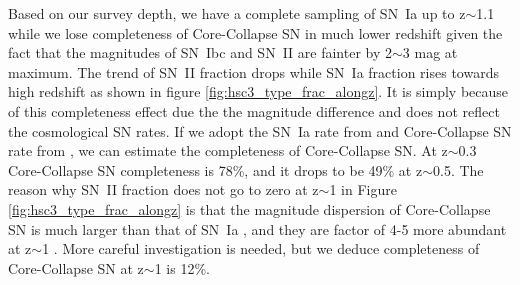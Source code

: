\documentclass[useamsfonts]{pasj01}
\begin{document}
Based on our survey depth, we have a complete sampling of SN~Ia up to z$\sim$1.1 while we lose completeness of Core-Collapse SN in much lower redshift given the fact that the magnitudes of SN~Ibc and SN~II are fainter by 2$\sim$3 mag at maximum.
The trend of SN~II fraction drops while SN~Ia fraction rises towards high redshift as shown in figure \ref{fig:hsc3_type_frac_alongz}. 
It is simply because of this completeness effect due the the magnitude difference and does not reflect the cosmological SN rates.
If we adopt the SN~Ia rate from \citet{graur14a} and Core-Collapse SN rate from \citet{strolger15a}, we can estimate the completeness of Core-Collapse SN. 
At z$\sim$0.3 Core-Collapse SN completeness is 78\%, and it drops to be 49\% at z$\sim$0.5. 
The reason why SN~II fraction does not go to zero at z$\sim$1 in Figure \ref{fig:hsc3_type_frac_alongz} is that the magnitude dispersion of Core-Collapse SN \citep[$\sigma$ $\sim$ 1.2 mag]{li11a,kessler19b} is much larger than that of SN~Ia \citep[$\sigma$ $\sim$ 0.5 mag]{rubin15a}, and they are factor of 4-5 more abundant at z$\sim$1 \citep{madau98a,hounsell18a}. 
More careful investigation is needed, but we deduce completeness %
of Core-Collapse SN at z$\sim$1 is 12\%.

%
%
%
\end{document}
